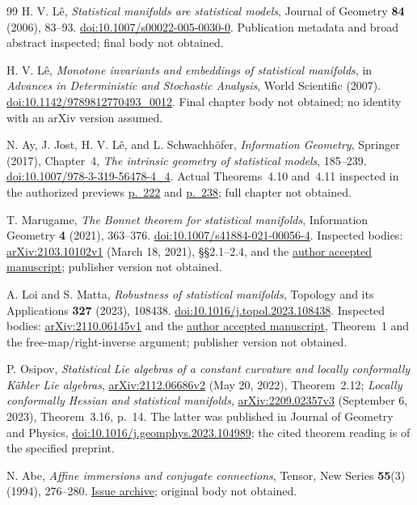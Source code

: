 \documentclass[10pt,letterpaper]{article}
\begin{document}
\begin{thebibliography}{99}
H. V. L\^e, \emph{Statistical manifolds are statistical models},
Journal of Geometry \textbf{84} (2006), 83--93.
\href{https://doi.org/10.1007/s00022-005-0030-0}{doi:10.1007/s00022-005-0030-0}.
Publication metadata and broad abstract inspected; final body not obtained.

H. V. L\^e, \emph{Monotone invariants and embeddings of statistical
manifolds}, in \emph{Advances in Deterministic and Stochastic Analysis},
World Scientific (2007).
\href{https://doi.org/10.1142/9789812770493_0012}{doi:10.1142/9789812770493\_0012}.
Final chapter body not obtained; no identity with an arXiv version assumed.

N. Ay, J. Jost, H. V. L\^e, and L. Schwachh\"ofer,
\emph{Information Geometry}, Springer (2017), Chapter~4,
\emph{The intrinsic geometry of statistical models}, 185--239.
\href{https://doi.org/10.1007/978-3-319-56478-4_4}{doi:10.1007/978-3-319-56478-4\_4}.
Actual Theorems~4.10 and~4.11 inspected in the authorized previews
\href{https://books.google.com/books?id=pLsyDwAAQBAJ&pg=PA222}{p.~222}
and \href{https://books.google.com/books?id=pLsyDwAAQBAJ&pg=PA238}{p.~238};
full chapter not obtained.

T. Marugame, \emph{The Bonnet theorem for statistical manifolds},
Information Geometry \textbf{4} (2021), 363--376.
\href{https://doi.org/10.1007/s41884-021-00056-4}{doi:10.1007/s41884-021-00056-4}.
Inspected bodies: \href{https://arxiv.org/abs/2103.10102v1}{arXiv:2103.10102v1}
(March 18, 2021), \S\S2.1--2.4, and the
\href{https://uec.repo.nii.ac.jp/record/10333/files/Bonnet_thm_statistical_mfd.pdf}{author accepted manuscript};
publisher version not obtained.

A. Loi and S. Matta, \emph{Robustness of statistical manifolds},
Topology and its Applications \textbf{327} (2023), 108438.
\href{https://doi.org/10.1016/j.topol.2023.108438}{doi:10.1016/j.topol.2023.108438}.
Inspected bodies: \href{https://arxiv.org/abs/2110.06145v1}{arXiv:2110.06145v1}
and the \href{https://iris.unica.it/retrieve/6dbf3c46-1ccf-403f-bb6f-a3757afe194a/TOPOL\%20108438_merged.pdf}{author accepted manuscript},
Theorem~1 and the free-map/right-inverse argument; publisher version not obtained.

P. Osipov, \emph{Statistical Lie algebras of a constant curvature and
locally conformally K\"ahler Lie algebras},
\href{https://arxiv.org/abs/2112.06686v2}{arXiv:2112.06686v2}
(May 20, 2022), Theorem~2.12;
\emph{Locally conformally Hessian and statistical manifolds},
\href{https://arxiv.org/abs/2209.02357v3}{arXiv:2209.02357v3}
(September 6, 2023), Theorem~3.16, p.~14.
The latter was published in Journal of Geometry and Physics,
\href{https://doi.org/10.1016/j.geomphys.2023.104989}{doi:10.1016/j.geomphys.2023.104989};
the cited theorem reading is of the specified preprint.

N. Abe, \emph{Affine immersions and conjugate connections}, Tensor,
New Series \textbf{55}(3) (1994), 276--280.
\href{https://dl.ndl.go.jp/en/pid/11196378}{Issue archive}; original body not obtained.
\end{thebibliography}
\end{document}

